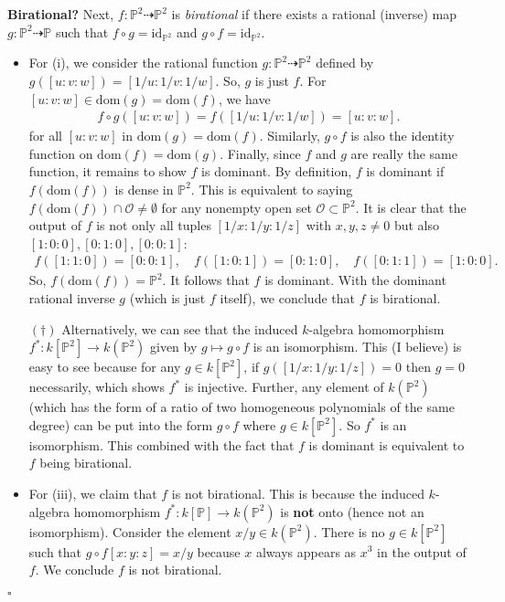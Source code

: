\documentclass[12pt]{article}
\begin{document}
\noindent \textbf{Birational?} Next, $f: \mathbb{P}^2 \dashrightarrow \mathbb{P}^2$ is \textit{birational} if there exists a rational (inverse) map $g: \mathbb{P}^2 \dashrightarrow \mathbb{P}$ such that $f\circ g = \mbox{id}_{\mathbb{P}^2}$ and $g\circ f = \mbox{id}_{\mathbb{P}^2}$. 
\begin{itemize}
\item For (i), we consider the rational function $g : \mathbb{P}^2 \dashrightarrow \mathbb{P}^2$ defined by $g([u:v:w]) = [1/u:1/v:1/w]$. So, $g$ is just $f$. For $[u:v:w] \in \mbox{dom}(g) = \mbox{dom}(f)$, we have
\begin{align*}
f\circ g([u:v:w]) = f([1/u:1/v:1/w]) = [u:v:w].
\end{align*}
for all $[u:v:w]$ in $\mbox{dom}(g) = \mbox{dom}(f)$. Similarly, $g\circ f$ is also the identity function on $\mbox{dom}(f) = \mbox{dom}(g)$. Finally, since $f$ and $g$ are really the same function, it remains to show $f$ is dominant. By definition, $f$ is dominant if $f(\mbox{dom}(f))$ is dense in $\mathbb{P}^2$. This is equivalent to saying $f(\mbox{dom}(f)) \cap \mathcal{O} \neq \emptyset$ for any nonempty open set $\mathcal{O} \subset \mathbb{P}^2$. It is clear that the output of $f$ is not only all tuples $[1/x:1/y:1/z]$ with $x,y,z\neq 0$ but also $[1:0:0], [0:1:0], [0:0:1]$: 
\begin{align*}
f([1:1:0]) = [0:0:1], \quad f([1:0:1]) = [0:1:0], \quad 
f([0:1:1]) = [1:0:0].
\end{align*}  
So, $f(\mbox{dom}(f)) = \mathbb{P}^2$. It follows that $f$ is dominant. With the dominant rational inverse $g$ (which is just $f$ itself), we conclude that $f$ is birational. 


$(\dagger)$ Alternatively, we can see that the induced $k$-algebra homomorphism $f^*: k[\mathbb{P}^2] \to k(\mathbb{P}^2)$ given by $g \mapsto g\circ f$ is an isomorphism. This (I believe) is easy to see because for any $g\in k[\mathbb{P}^2]$, if $g([1/x:1/y:1/z]) = 0$ then $g =0$ necessarily, which shows $f^*$ is injective. Further, any element of $k(\mathbb{P}^2)$ (which has the form of a ratio of two homogeneous polynomials of the same degree) can be put into the form $g\circ f$ where $g\in k[\mathbb{P}^2]$. So $f^*$ is an isomorphism. This combined with the fact that $f$ is dominant is equivalent to $f$ being birational.  


\item For (iii), we claim that $f$ is not birational. This is because the induced $k$-algebra homomorphism $f^* : k[\mathbb{P}] \to k(\mathbb{P}^2)$ is \textbf{not} onto (hence not an isomorphism).  Consider the element $x/y \in k(\mathbb{P}^2)$. There is no $g\in k[\mathbb{P}^2]$ such that $g\circ f[x:y:z] = x/y$ because $x$ always appears as $x^3$ in the output of $f$. We conclude $f$ is not birational.
\end{itemize}
\hfill $\square$
\end{document}
